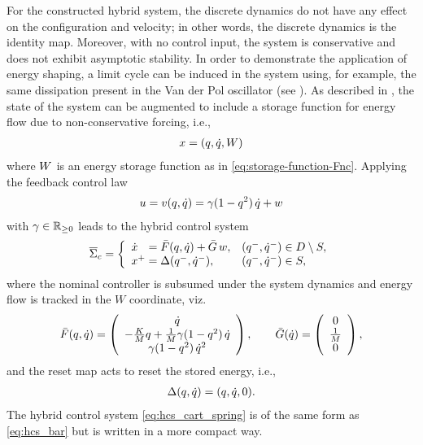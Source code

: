 For the constructed hybrid system, the discrete dynamics do not have any effect
on the configuration and velocity; in other words, the discrete dynamics is the
identity map.
%
Moreover, with no control input, the system is conservative and does not exhibit
asymptotic stability.
%
In order to demonstrate the application of energy shaping, a limit cycle can be
induced in the system using, for example, the same dissipation present in the
Van der Pol oscillator (see \cite[pp.~13]{Khalil2002}).
%
As described in , the state of the system can be
augmented to include a storage function for energy flow due to non-conservative
forcing, i.e.,
\begin{align*}
  x = (q, \dot{q}, W)
\end{align*}
where $W$ is an energy storage function as in \eqref{eq:storage-function-Fnc}.
%
Applying the feedback control law
\begin{align}
  \label{eq:spring_cart_vdp_controller}
  u = v(q, \dot{q}) = \gamma(1 - q^{2}) \, \dot{q} + w
\end{align}
with $\gamma \in \mathbb{R}_{\geq 0}$ leads to the hybrid control system
\begin{align}
  \label{eq:hcs_cart_spring}
  {\overline {\Sigma}}_{c} = \left\{
  \begin{array}{l l}
    {\dot {x}}\hphantom{^+} = {\bar {F}}(q, \dot{q}) + {\bar {G}} \, w, & (q^{-}, \dot{q}^{-}) \in D \setminus S,\\
    x^{+} = \Delta(q^{-}, \dot{q}^{-}), & (q^{-}, \dot{q}^{-}) \in S,
  \end{array}\right.
\end{align}
where the nominal controller is subsumed under the system dynamics and energy
flow is tracked in the $W$ coordinate, viz.
\begin{align}
  \label{eq:FGbar_cart_spring}
  {\bar {F}}(q, \dot{q}) = \left(\begin{array}{c}
      \dot{q}\\
      -\frac{K}{M} q + \frac{1}{M} \gamma(1 - q^{2}) \, \dot{q}\\
      \gamma(1 - q^{2}) \, \dot{q}^{2}
    \end{array}\right), \qquad
  {\bar {G}}(\dot{q}) = \left(\begin{array}{c}
      0\\
      \frac{1}{M}\\
      0
    \end{array}\right),
\end{align}
and the reset map acts to reset the stored energy, i.e.,
\begin{align*}
  \Delta(q, \dot{q}) = (q, \dot{q}, 0).
\end{align*}
%
The hybrid control system \eqref{eq:hcs_cart_spring} is of the same form as
\eqref{eq:hcs_bar} but is written in a more compact way.


